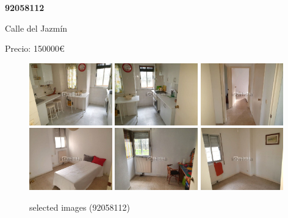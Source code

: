 \documentclass[10pt,a4paper]{report}
\begin{document}
\newpage
\begin{center}
\begin{large}
\textbf{92058112}\\[10px]
\end{large}
Calle del Jazmín
\end{center}
Precio: 150000€
\begin{figure}[htbp]

\includegraphics[width=0.32\textwidth]{arfima/92058112/92058112-001.jpg}
\includegraphics[width=0.32\textwidth]{arfima/92058112/92058112-002.jpg}
\includegraphics[width=0.32\textwidth]{arfima/92058112/92058112-003.jpg}
\includegraphics[width=0.32\textwidth]{arfima/92058112/92058112-004.jpg}
\includegraphics[width=0.32\textwidth]{arfima/92058112/92058112-005.jpg}
\includegraphics[width=0.32\textwidth]{arfima/92058112/92058112-006.jpg}
\caption{selected images (92058112)}
\end{figure}
\end{document}

